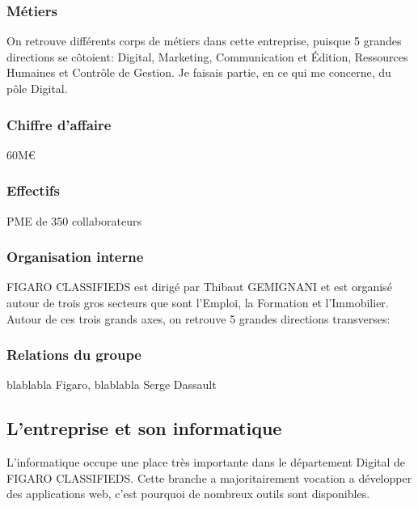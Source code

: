 \subsubsection{Métiers}

On retrouve différents corps de métiers dans cette entreprise, puisque 5 grandes directions se côtoient:  Digital, Marketing, Communication et Édition, Ressources Humaines et Contrôle de Gestion.
Je faisais partie, en ce qui me concerne, du pôle Digital.

\subsubsection{Chiffre d'affaire}

60M€

\subsubsection{Effectifs}

PME de 350 collaborateurs

\subsubsection{Organisation interne}

FIGARO CLASSIFIEDS est dirigé par Thibaut GEMIGNANI et est organisé autour de trois gros secteurs que sont l'Emploi, la Formation et l'Immobilier. Autour de ces trois grands axes, on retrouve 5 grandes directions transverses:

\subsubsection{Relations du groupe}

blablabla Figaro, blablabla Serge Dassault


\subsection{L'entreprise et son informatique}
L'informatique occupe une place très importante dans le département Digital de FIGARO CLASSIFIEDS.
Cette branche a majoritairement vocation a développer des applications web, c'est pourquoi de nombreux outils sont disponibles.

